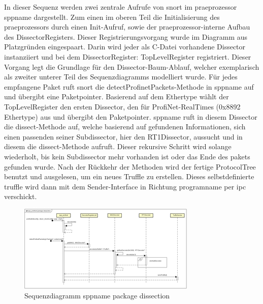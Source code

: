 
In dieser Sequenz werden zwei zentrale Aufrufe von \gls{snort} im \gls{praeprozessor} \gls{sppname} dargestellt. Zum einen im oberen Teil die Initialisierung des \gls{praeprozessor}s durch einen Init-Aufruf, sowie der \gls{praeprozessor}-interne Aufbau des DissectorRegisters. Dieser Registrierungsvorgang wurde im Diagramm aus Platzgründen eingespaart. Darin wird jeder als C-Datei vorhandene Dissector instanziiert und bei dem DissectorRegister: TopLevelRegister registriert. Dieser Vorgang legt die Grundlage für den Dissector-Baum-Ablauf, welcher exemplarisch als zweiter unterer Teil des Sequenzdiagramms modelliert wurde. Für jedes empfangene Paket ruft \gls{snort} die detectProfinetPackets-Methode in \gls{sppname} auf und übergibt eine Paketpointer. Basierend auf dem Ethertype wählt der TopLevelRegister den ersten Dissector, den für ProfiNet-RealTimes (0x8892 Ethertype) aus und übergibt den Paketpointer. \gls{sppname} ruft in diesem Dissector die dissect-Methode auf, welche basierend auf gefundenen Informationen, sich einen passenden seiner Subdissector, hier den RT1Dissector, aussucht und in diesem die dissect-Methode aufruft. Dieser rekursive Schritt wird solange wiederholt, bis kein Subdissector mehr vorhanden ist oder das Ende des \gls{paket}s gefunden wurde.
Nach der Rückkehr der Methoden wird der fertige ProtocolTree benutzt und ausgelesen, um ein neues \gls{Truffle} zu erstellen. Dieses selbstdefinierte \gls{truffle} wird dann mit dem Sender-Interface in Richtung \gls{programname} per \gls{ipc} verschickt.

\begin{figure}[H]
  \centering
  \includegraphics[width=\textwidth]{../diagramimages/spp-profinet-package-dissection.png}
  \caption[Sequenzdiagramm \gls{sppname} package dissection]{Sequenzdiagramm \gls{sppname} package dissection}
\end{figure} 